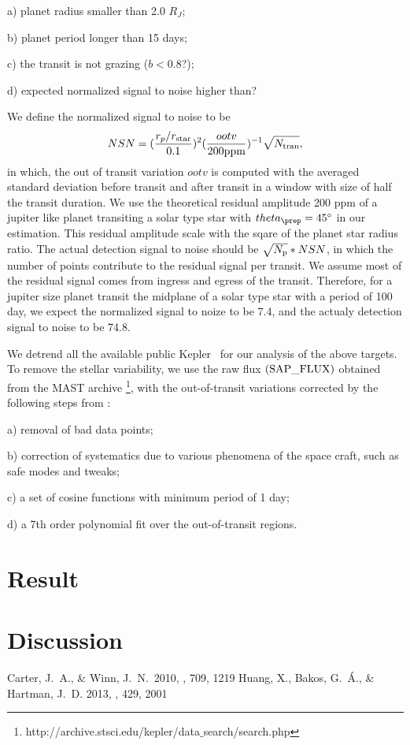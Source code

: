 \documentclass{emulateapj}
\begin{document}
a) planet radius smaller than 2.0 $R_J$; 

b) planet period longer than 15 days; %

c) the transit is not grazing ($b<0.8$?);  

d) expected normalized signal to noise higher than?

We define the normalized signal to noise to be 
\begin{equation}
NSN = (\frac{r_p/r_{\rm star}}{0.1})^2(\frac{ootv}{200{\rm ppm}})^{-1}\sqrt{N_{\rm tran}},
\end{equation}
in which, the out of transit variation $ootv$ is computed with the averaged 
standard deviation before transit and after transit in a window with size of 
half the transit duration. We use the theoretical residual amplitude 200 ppm 
of a jupiter like planet transiting a solar type star with 
$theta_\prep=45^{\circ}$ in our estimation. This residual amplitude scale with 
the sqare of the planet star radius ratio.  
The actual detection signal to noise should be $\sqrt{N_{\rm p}}*NSN$, in 
which the number of points contribute to the residual signal per transit. 
We assume most of the residual signal comes from ingress and egress of the 
transit. 
Therefore, for a jupiter size planet transit the midplane of a solar type 
star with a period of 100 day, we expect the normalized signal to noize to be 
7.4, and the actualy detection signal to noise to be 74.8.  


We detrend all the available public Kepler \lcs\ for our analysis of the above targets. 
To remove the stellar variability, we use the raw flux $(\rm SAP\_FLUX)$ obtained from the MAST archive
\footnote{http://archive.stsci.edu/kepler/data$\_$search/search.php}, with the 
out-of-transit variations corrected by the following steps from 
\citet{Huang:2013}:

a) removal of bad data points;

b) correction of systematics due to various phenomena of the space craft, such as safe modes and tweaks;

c) a set of cosine functions with minimum period of 1 day; 

d) a 7th order polynomial fit over the out-of-transit regions. 


\section{Result}

\section{Discussion}


\begin{thebibliography}{}
 Carter, J.~A., \& Winn, J.~N.\ 2010, \apj, 709, 1219
{Huang}, X., {Bakos}, G.~{\'A}., \& {Hartman}, J.~D. 2013, \mnras, 429, 2001

\end{thebibliography}
\end{document}
